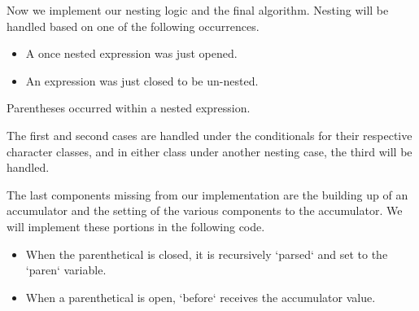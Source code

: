 Now we implement our nesting logic and the final algorithm. Nesting will be handled 
based on one of the following occurrences.

\begin{itemize}
  \item A once nested expression was just opened.
  \item An expression was just closed to be un-nested.
\end{itemize}
 Parentheses occurred within a nested expression.

The first and second cases are handled under the conditionals for their respective 
character classes, and in either class under another nesting case, the third will be 
handled.

The last components missing from our implementation are the building up of an 
accumulator and the setting of the various components to the accumulator. We will 
implement these portions in the following code.

\begin{itemize}
  \item When the parenthetical is closed, it is recursively `parsed` and set to the `paren` variable.
  \item When a parenthetical is open, `before` receives the accumulator value.
\end{itemize}

